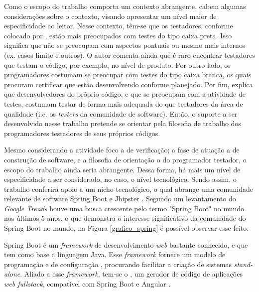 Como o escopo do trabalho comporta um contexto abrangente, cabem algumas considerações sobre o contexto, visando apresentar um nível maior de especificidade ao leitor. Nesse contexto, têm-se que os testadores, conforme colocado por \cite{goodliffe2007code}, estão mais preocupados com testes do tipo caixa preta. Isso significa que não se preocupam com aspectos pontuais ou mesmo mais internos (ex. casos limite e outros). O autor comenta ainda que é raro encontrar testadores que testam o código, por exemplo, no nível de produto. Por outro lado, os programadores costumam se preocupar com testes do tipo caixa branca, os quais procuram certificar que estão desenvolvendo conforme planejado. Por fim, \cite{goodliffe2007code} explica que desenvolvedores do próprio código, e que se preocupam com a atividade de testes, costumam testar de forma mais adequada do que testadores da área de qualidade (i.e. os \textit{testers} da comunidade de software). Então, o suporte a ser desenvolvido nesse trabalho pretende se orientar pela filosofia de trabalho dos programadores testadores de seus próprios códigos.

Mesmo considerando a atividade foco a de verificação; a fase de atuação a de construção de software, e a filosofia de orientação o do programador testador, o escopo do trabalho ainda seria abrangente. Dessa forma, há mais um nível de especificidade a ser considerado, no caso, o nível tecnológico. Sendo assim, o trabalho conferirá apoio a um nicho tecnológico, o qual abrange uma comunidade relevante de software Spring Boot \cite{spring_boot2019} e Jhipster \cite{jhipster2019}. Segundo um levantamento do \textit{Google Trends} houve uma busca crescente pelo termo "Spring Boot" no mundo nos últimos 5 anos, o que demonstra o interesse significativo da comunidade do Spring Boot no mundo, na Figura \ref{grafico_spring} é possível observar esse feito.

Spring Boot é um  \textit{framework} de desenvolvimento  \textit{web} bastante conhecido, e que tem como base a linguagem Java. Esse  \textit{framework} fornece um modelo de programação e de configuração \cite{gutierrez2014introducing}, procurando facilitar a criação de sistemas  \textit{stand-alone}. Aliado a esse  \textit{framework}, tem-se o \cite{jhipster2019}, um gerador de código de aplicações  \textit{web fullstack}, compatível com  Spring Boot e  Angular \cite{angular2019} \cite{raible_jhipster_2016}.

